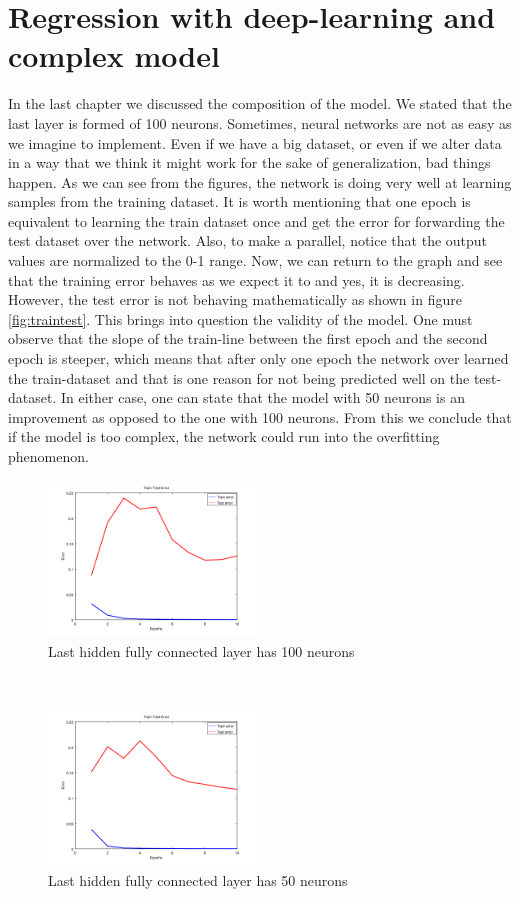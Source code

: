 \section{Regression with deep-learning and complex model}
In the last chapter we discussed the composition of the model. We stated that the last layer is formed of 100 neurons. Sometimes, neural networks are not as easy as we imagine to implement. Even if we have a big dataset, or even if we alter data in a way that we think it might work for the sake of generalization, bad things happen. As we can see from the figures, the network is doing very well at learning samples from the training dataset. It is worth mentioning that one epoch is equivalent to learning the train dataset once and get the error for forwarding the test dataset over the network. Also, to make a parallel, notice that the output values are normalized to the 0-1 range. Now, we can return to the graph and see that the training error behaves as we expect it to and yes, it is decreasing. However, the test error is not behaving mathematically as shown in figure \ref{fig:traintest}. This brings into question the validity of the model. One must observe that the slope of the train-line between the first epoch and the second epoch is steeper, which means that after only one epoch the network over learned the train-dataset and that is one reason for not being predicted well on the test-dataset. In either case, one can state that the model with 50 neurons is an improvement as opposed to the one with 100 neurons. From this we conclude that if the model is too complex, the network could run into the overfitting phenomenon.
\begin{figure}[h]
	\begin{center}
		\includegraphics[width=209px,height=157px]{src/img/results/train-test-100}
		\caption{Last hidden fully connected layer has 100 neurons} \label{fig:50tt}
    \end{center}
\end{figure}
~\\
\begin{figure}[h]
	\begin{center}
		\includegraphics[width=209px,height=157px]{src/img/results/train-test-50}
		\caption{Last hidden fully connected layer has 50 neurons} \label{fig:100tt}
    \end{center}
\end{figure}

